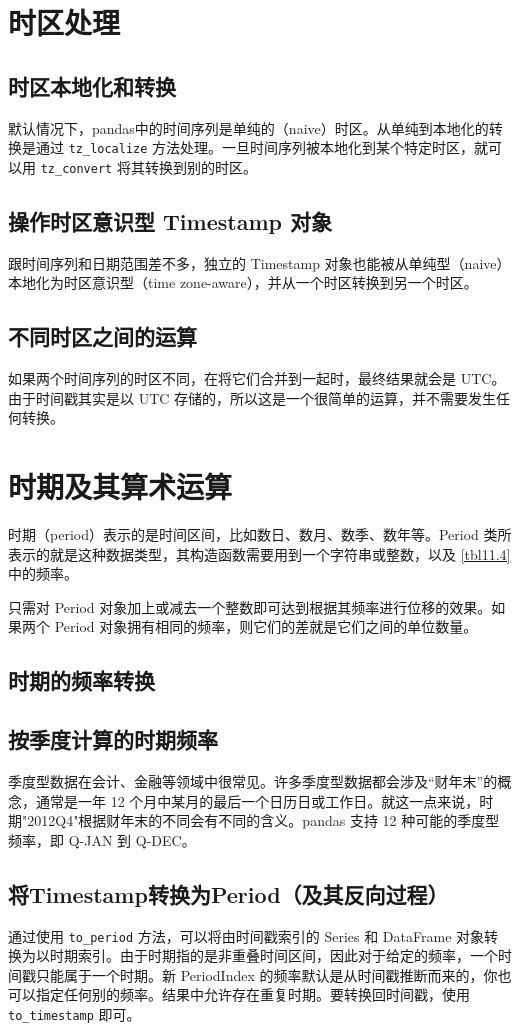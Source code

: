 \section{时区处理}
\subsection{时区本地化和转换}
默认情况下，pandas中的时间序列是单纯的（naive）时区。从单纯到本地化的转换是通过 \verb|tz_localize| 方法处理。一旦时间序列被本地化到某个特定时区，就可以用 \verb|tz_convert| 将其转换到别的时区。
\subsection{操作时区意识型 Timestamp 对象}
跟时间序列和日期范围差不多，独立的 Timestamp 对象也能被从单纯型（naive）本地化为时区意识型（time zone-aware），并从一个时区转换到另一个时区。
\subsection{不同时区之间的运算}
如果两个时间序列的时区不同，在将它们合并到一起时，最终结果就会是 UTC。由于时间戳其实是以 UTC 存储的，所以这是一个很简单的运算，并不需要发生任何转换。
\section{时期及其算术运算}
时期（period）表示的是时间区间，比如数日、数月、数季、数年等。Period 类所表示的就是这种数据类型，其构造函数需要用到一个字符串或整数，以及 \autoref{tbl11.4} 中的频率。

只需对 Period 对象加上或减去一个整数即可达到根据其频率进行位移的效果。如果两个 Period 对象拥有相同的频率，则它们的差就是它们之间的单位数量。

\subsection{时期的频率转换}
\subsection{按季度计算的时期频率}
季度型数据在会计、金融等领域中很常见。许多季度型数据都会涉及“财年末”的概念，通常是一年 12 个月中某月的最后一个日历日或工作日。就这一点来说，时期"2012Q4"根据财年末的不同会有不同的含义。pandas 支持 12 种可能的季度型频率，即 Q-JAN 到 Q-DEC。
\subsection{将Timestamp转换为Period（及其反向过程）}
通过使用 \verb|to_period| 方法，可以将由时间戳索引的 Series 和 DataFrame 对象转换为以时期索引。由于时期指的是非重叠时间区间，因此对于给定的频率，一个时间戳只能属于一个时期。新 PeriodIndex 的频率默认是从时间戳推断而来的，你也可以指定任何别的频率。结果中允许存在重复时期。要转换回时间戳，使用 \verb|to_timestamp| 即可。
